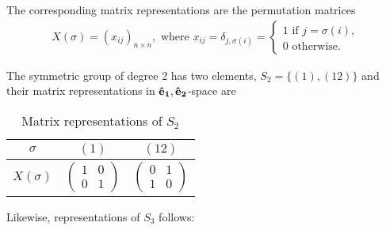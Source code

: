 	The corresponding matrix representations are the permutation matrices
	\begin{align}
		X(\sigma) = (x_{ij})_{n \times n}, \text{ where } x_{ij} = \delta_{j,\sigma(i)} = \begin{cases}
			1 \text{ if } j = \sigma(i),\\
			0 \text{ otherwise.}
		\end{cases}
	\end{align}
	
	\begin{example}[$S_n$ for $n = 2,3$]
		
		The symmetric group of degree 2 has two elements, $S_2 = \{(1), (12)\}$ and their matrix representations in $\mathbf{\mathbf{\hat{e}}_1},\mathbf{\mathbf{\hat{e}}_2}$-space are
		\begin{table}[hbt!]
			\centering
			\caption{Matrix representations of $S_2$}
			\begin{tabular}{c | c c}
				$\sigma$    & $(1)$ & $(12)$ \\
				\hline
				$X(\sigma)$ & $\begin{pmatrix}
					1 & 0 \\ 0 & 1
				\end{pmatrix}$ & $\begin{pmatrix}
					0 & 1 \\ 1 & 0
				\end{pmatrix}$
			\end{tabular}
		\end{table}
		
		Likewise, representations of $S_3$ follows:
		

\end{example}
